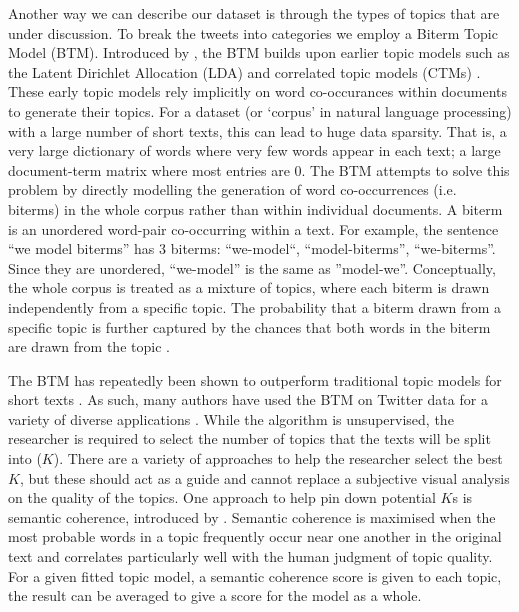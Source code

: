 \documentclass[11pt]{article}
\begin{document}
Another way we can describe our dataset is through the types of topics that are under discussion. To break the tweets into categories we employ a Biterm Topic Model (BTM). Introduced by \cite{yan2013biterm}, the BTM builds upon earlier topic models such as the Latent Dirichlet Allocation (LDA) \citep{blei2003latent} and correlated topic models (CTMs) \citep{blei2006correlated}. These early topic models rely implicitly on word co-occurances within documents to generate their topics. For a dataset (or `corpus' in natural language processing) with a large number of short texts, this can lead to huge data sparsity. That is, a very large dictionary of words where very few words appear in each text; a large document-term matrix where most entries are 0. The BTM attempts to solve this problem by directly modelling the generation of word co-occurrences (i.e. biterms) in the whole corpus rather than within individual documents. A biterm is an unordered word-pair co-occurring within a text. For example, the sentence ``we model biterms'' has 3 biterms: ``we-model``, ``model-biterms'', ``we-biterms''. Since they are unordered, ``we-model'' is the same as ''model-we''. Conceptually, the whole corpus is treated as a mixture of topics, where each biterm is drawn independently from a specific topic. The probability that a biterm drawn from a specific topic is further captured by the chances that both words in the biterm are drawn from the topic \citep{yan2013biterm}.

The BTM has repeatedly been shown to outperform traditional topic models for short texts \citep{yan2013biterm, jonsson2015evaluation, chen2015user}. As such, many authors have used the BTM on Twitter data for a variety of diverse applications \citep[to name a few]{mackey2018solution, han2016exploratory, khan2021twitter}. While the algorithm is unsupervised, the researcher is required to select the number of topics that the texts will be split into ($K$). There are a variety of approaches to help the researcher select the best $K$, but these should act as a guide and cannot replace a subjective visual analysis on the quality of the topics. One approach to help pin down potential $K$s is semantic coherence, introduced by \cite{mimno2011optimizing}. Semantic coherence is maximised when the most probable words in a topic frequently occur near one another in the original text and correlates particularly well with the human judgment of topic quality. For a given fitted topic model, a semantic coherence score is given to each topic, the result can be averaged to give a score for the model as a whole.
\end{document}
